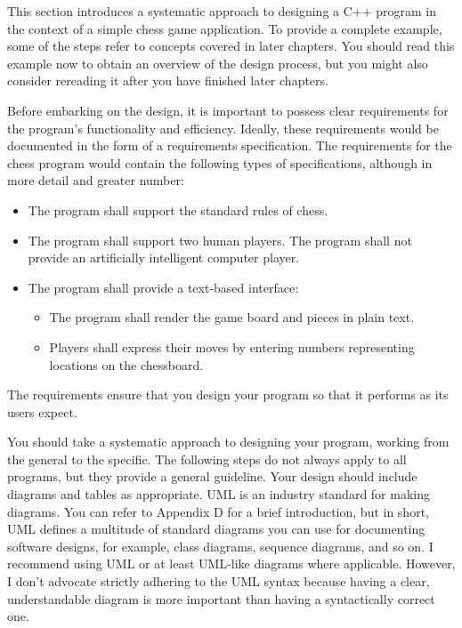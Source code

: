 
This section introduces a systematic approach to designing a C++ program in the context of a simple chess game application. To provide a complete example, some of the steps refer to concepts covered in later chapters. You should read this example now to obtain an overview of the design process, but you might also consider rereading it after you have finished later chapters.


Before embarking on the design, it is important to possess clear requirements for the program’s functionality and efficiency. Ideally, these requirements would be documented in the form of a requirements specification. The requirements for the chess program would contain the following types of specifications, although in more detail and greater number:

\begin{itemize}
\item
The program shall support the standard rules of chess.

\item
The program shall support two human players. The program shall not provide an artificially intelligent computer player.

\item
The program shall provide a text-based interface:
\begin{itemize}
\item
The program shall render the game board and pieces in plain text.

\item
Players shall express their moves by entering numbers representing locations on the chessboard.
\end{itemize}
\end{itemize}

The requirements ensure that you design your program so that it performs as its users expect.


You should take a systematic approach to designing your program, working from the general to the specific. The following steps do not always apply to all programs, but they provide a general guideline. Your design should include diagrams and tables as appropriate. UML is an industry standard for making diagrams. You can refer to Appendix D for a brief introduction, but in short, UML defines a multitude of standard diagrams you can use for documenting software designs, for example, class diagrams, sequence diagrams, and so on. I recommend using UML or at least UML-like diagrams where applicable. However, I don’t advocate strictly adhering to the UML syntax because having a clear, understandable diagram is more important than having a syntactically correct one.

